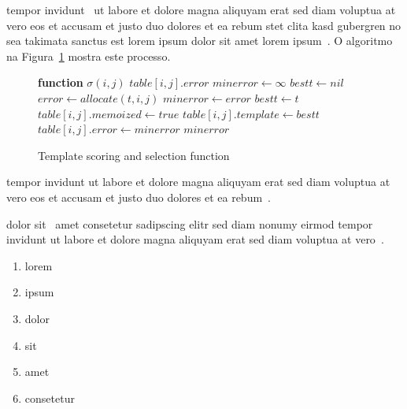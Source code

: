 tempor invidunt~\cite{SKIENAC698} ut labore et dolore magna
aliquyam erat sed diam voluptua at vero eos et accusam et justo
duo dolores et ea rebum stet clita kasd gubergren no sea takimata
sanctus est lorem ipsum dolor sit amet lorem
ipsum~\cite{NAGAPACKING07}. O algoritmo na Figura~\ref{fig:algo}
mostra este processo.

\begin{figure}[htb!]
\begin{center}
      \begin{algorithmic}[1]
         \STATE \textbf{function} $\sigma\left(i,j\right)$
         \STATE {}
             \RETURN $table\left[i,j\right].error$
           \ENDIF
         \STATE $minerror\leftarrow\infty$
         \STATE $bestt\leftarrow{}nil$
           \STATE $error\leftarrow{}allocate\left(t,i,j\right)$
             \STATE $minerror\leftarrow{}error$
             \STATE $bestt\leftarrow{}t$
           \ENDIF
         \ENDFOR
         \STATE $table\left[i,j\right].memoized\leftarrow{}true$
         \STATE $table\left[i,j\right].template\leftarrow{}bestt$
         \STATE $table\left[i,j\right].error\leftarrow{}minerror$
         \RETURN $minerror$
      \end{algorithmic}
      \caption{\label{fig:algo}Template scoring and selection function}
\end{center}
\end{figure}

tempor invidunt ut labore et dolore magna aliquyam erat sed diam
voluptua at vero eos et accusam et justo duo dolores et ea
rebum~\cite{CORMEMALGORITHMS01}.

dolor sit~\cite{BENTLEYBC07} amet consetetur sadipscing elitr sed
diam nonumy eirmod tempor invidunt ut labore et dolore magna
aliquyam erat sed diam voluptua at vero~\cite{BRIANPL04}.

\begin{enumerate}
   \item lorem
   \item ipsum
   \item dolor
   \item sit
   \item amet
   \item consetetur
\end{enumerate}

